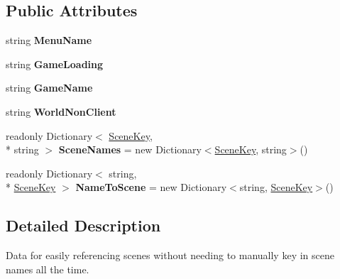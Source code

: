 \subsection*{Public Attributes}
\begin{DoxyCompactItemize}
\item 
\hypertarget{class_scene_data_afbb76c0a95550a3ae6f78f792e0a9bd2}{string {\bfseries Menu\-Name}}\label{class_scene_data_afbb76c0a95550a3ae6f78f792e0a9bd2}

\item 
\hypertarget{class_scene_data_a4b7849afd57de2994089d08ea4d7b2d4}{string {\bfseries Game\-Loading}}\label{class_scene_data_a4b7849afd57de2994089d08ea4d7b2d4}

\item 
\hypertarget{class_scene_data_a7cc8b24dcd8903bb3199be8297def99d}{string {\bfseries Game\-Name}}\label{class_scene_data_a7cc8b24dcd8903bb3199be8297def99d}

\item 
\hypertarget{class_scene_data_a6308a34931e2539f7bb35de881bb9654}{string {\bfseries World\-Non\-Client}}\label{class_scene_data_a6308a34931e2539f7bb35de881bb9654}

\item 
\hypertarget{class_scene_data_ae3973806664f840746168615a790c1f2}{readonly Dictionary$<$ \hyperlink{class_scene_data_a79d397b3deef242a865470283d96f2e6}{Scene\-Key}, \\*
string $>$ {\bfseries Scene\-Names} = new Dictionary$<$\hyperlink{class_scene_data_a79d397b3deef242a865470283d96f2e6}{Scene\-Key}, string$>$()}\label{class_scene_data_ae3973806664f840746168615a790c1f2}

\item 
\hypertarget{class_scene_data_a17557fe1afd8969412d2fe04f77bfe6c}{readonly Dictionary$<$ string, \\*
\hyperlink{class_scene_data_a79d397b3deef242a865470283d96f2e6}{Scene\-Key} $>$ {\bfseries Name\-To\-Scene} = new Dictionary$<$string, \hyperlink{class_scene_data_a79d397b3deef242a865470283d96f2e6}{Scene\-Key}$>$()}\label{class_scene_data_a17557fe1afd8969412d2fe04f77bfe6c}

\end{DoxyCompactItemize}


\subsection{Detailed Description}
Data for easily referencing scenes without needing to manually key in scene names all the time. 



